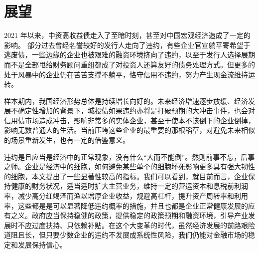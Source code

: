 \chapter{展望}

2021 年以来，中资高收益债走入了至暗时刻，甚至对中国宏观经济造成了一定的影响。
部分过去曾经名誉较好的发行人走向了违约，有些企业官宣躺平寄希望于逃废债，一些边缘的企业也被艰难的融资环境挤向了违约，以至于发行人选择展期而不是全部甩给财务顾问重组都成了对投资人还算友好的债务处理方式。但更多的处于风暴中的企业仍在苦苦支撑不躺平，恪守信用不违约，努力产生现金流维持运转。

样本期内，我国经济形势总体是持续增长向好的。未来经济增速逐步放缓、经济发展不确定性增加的背景下，城投债如果违约亦将是打破预期的大冲击事件，也会对信用债市场造成冲击，影响非常多的实体企业，甚至于使本不该倒下的企业倒掉，影响无数普通人的生活。当前压垮这些企业的最重要的那根稻草，对避免未来相似的场景重新发生，也有一定的借鉴意义。

违约是且应当是经济中的正常现象，没有什么“大而不能倒”。然则前事不忘，后事之师。企业是经济中的细胞，如何避免某些单个的细胞坏死影响更多具有强大韧性的细胞，本文提出了一些显著性较高的指标。我们可以看到，就目前而言，企业保持健康的财务状况，适当适时扩大主营业务，维持一定的营运资本和息税前利润率，减少高分红竭泽而渔以增厚企业收益，规避高杠杆，提升资产周转率和利用率，这些都是是可以显著降低违约概率的措施，并且也都是企业正常健康发展的应有之义。政府应当保持稳健的政策，提供稳定的政策预期和融资环境，引导产业发展时不应过度扶持、只依赖补贴。在这个大变革的时代，虽然经济发展的前路艰险道阻且长，但只要少数企业的违约不发展成系统性风险，我们仍能对金融市场的稳定和发展保持信心。

